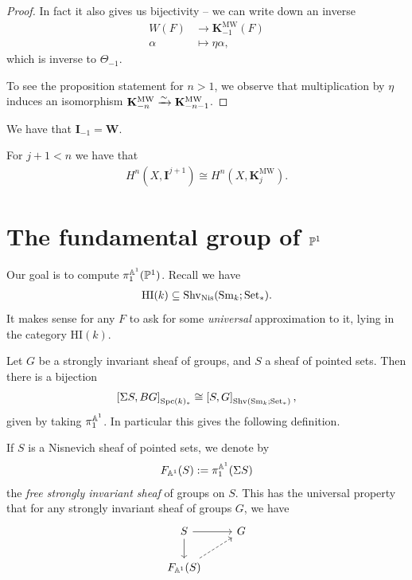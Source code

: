 \documentclass[11pt,openany]{book}
\providecommand{\HI}{\mathrm{HI}}
\providecommand{\KMW}{\mathbf{K}^\mathrm{MW}}
\begin{document}
\begin{proof}
In fact it also gives us bijectivity -- we can write down an inverse
\begin{align*}
    W(F) &\to \KMW_{-1}(F) \\
    \alpha &\mapsto \eta \alpha,
\end{align*}
which is inverse to $\Theta_{-1}$.

To see the proposition statement for $n > 1$, we observe that multiplication by $\eta$ induces an isomorphism $\KMW_{-n}\xto{\sim} \KMW_{-n-1}$.
\end{proof}

\begin{corollary} We have that $\mathbf{I}_{-1} = \mathbf{W}$.
\end{corollary}


\begin{corollary} For $j+1<n$ we have that
\begin{align*}
    H^n(X, \mathbf{I}^{j+1}) \cong H^n(X, \KMW_j).
\end{align*}
\end{corollary}

\section{The fundamental group of \texorpdfstring{$\P^1$}{P\^{}1}}

Our goal is to compute $\pi_1^{\A^1}(\P^1)$. Recall we have
\begin{align*}
    \HI(k) \subseteq \Shv_\Nis(\Sm_k;\Set_\ast).
\end{align*}
It makes sense for any $F$ to ask for some \textit{universal} approximation to it, lying in the category $\HI(k)$.

Let $G$ be a strongly invariant sheaf of groups, and $S$ a sheaf of pointed sets. Then there is a bijection
\begin{align*}
    \left[ \Sigma S, BG \right]_{\Spc(k)_\ast} \cong \left[ S, G \right]_{\Shv(\Sm_k;\Set_\ast)},
\end{align*}
given by taking $\pi_1^{\A^1}$. In particular this gives the following definition.

\begin{definition} \cite[7.23]{Morel} If $S$ is a Nisnevich sheaf of pointed sets, we denote by
\begin{align*}
    F_{\A^1}(S) := \pi_1^{\A^1}(\Sigma S)
\end{align*}
the \textit{free strongly invariant sheaf} of groups on $S$. This has the universal property that for any strongly invariant sheaf of groups $G$, we have
\[\begin{tikzcd}
    S\rar\dar & G\\
    F_{\A^1}(S)\ar[ur,dashed] & 
\end{tikzcd} \]
\end{definition}
\end{document}
